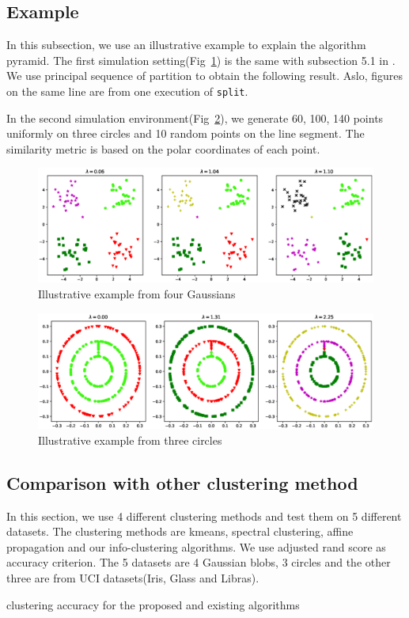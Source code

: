 \documentclass{article}
\begin{document}
\subsection{Example}

In this subsection, we use an illustrative example to explain the algorithm pyramid.
The first simulation setting(Fig~\ref{fig:4p}) is the same with subsection 5.1 in \cite{mac}.  We use principal sequence of partition to obtain the following result.
Aslo, figures on the same line are from one execution of \texttt{split}.

In the second simulation environment(Fig~\ref{fig:3c}), we generate 60, 100, 140 points uniformly on three circles and 10 random points on the line segment. The similarity metric is based on the polar coordinates of each point.

\begin{figure}[!ht]
\includegraphics[width=12cm]{pic/4part.eps}
\caption{Illustrative example from four Gaussians}\label{fig:4p}
\end{figure}

\begin{figure}[!ht]
\includegraphics[width=12cm]{pic/3circle.eps}
\caption{Illustrative example from three circles}\label{fig:3c}
\end{figure}
\subsection{Comparison with other clustering method}
In this section, we use 4 different clustering methods and test them on 5 different datasets. The clustering methods are kmeans, spectral clustering, affine propagation and our info-clustering algorithms. We use adjusted rand score as accuracy criterion. The 5 datasets are 4 Gaussian blobs, 3 circles and the other three are from UCI datasets(Iris, Glass and Libras).
\begin{table}[!ht]
\centering
{}
\caption{clustering accuracy for the proposed and existing algorithms}
\end{table}
\end{document}

